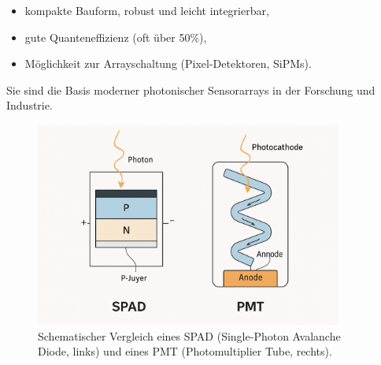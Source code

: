 \begin{itemize}
	\item kompakte Bauform, robust und leicht integrierbar,
	\item gute Quanteneffizienz (oft über 50\%),
	\item Möglichkeit zur Arrayschaltung (Pixel-Detektoren, SiPMs).
\end{itemize}

Sie sind die Basis moderner photonischer Sensorarrays in der Forschung und Industrie.
\begin{figure}[H]
	\centering
	\includegraphics[width=0.9\textwidth]{bilder/SPAD-PMT.png}
	\caption{Schematischer Vergleich eines SPAD (Single-Photon Avalanche Diode, links) und eines PMT (Photomultiplier Tube, rechts). }
	\label{fig:spad_pmt}
\end{figure}

